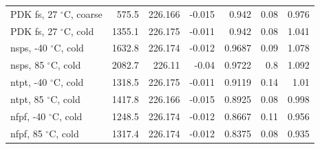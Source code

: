 \begin{tabular}{lrrrrrr}
PDK fs, 27 $^\circ$C, coarse & 575.5 & 226.166 & -0.015 & 0.942 & 0.08 & 0.976 \\
PDK fs, 27 $^\circ$C, cold & 1355.1 & 226.175 & -0.011 & 0.942 & 0.08 & 1.041 \\
nsps, -40 $^\circ$C, cold & 1632.8 & 226.174 & -0.012 & 0.9687 & 0.09 & 1.078 \\
nsps, 85 $^\circ$C, cold & 2082.7 & 226.11 & -0.04 & 0.9722 & 0.8 & 1.092 \\
ntpt, -40 $^\circ$C, cold & 1318.5 & 226.175 & -0.011 & 0.9119 & 0.14 & 1.01 \\
ntpt, 85 $^\circ$C, cold & 1417.8 & 226.166 & -0.015 & 0.8925 & 0.08 & 0.998 \\
nfpf, -40 $^\circ$C, cold & 1248.5 & 226.174 & -0.012 & 0.8667 & 0.11 & 0.956 \\
nfpf, 85 $^\circ$C, cold & 1317.4 & 226.174 & -0.012 & 0.8375 & 0.08 & 0.935 \\
\bottomrule\end{tabular}